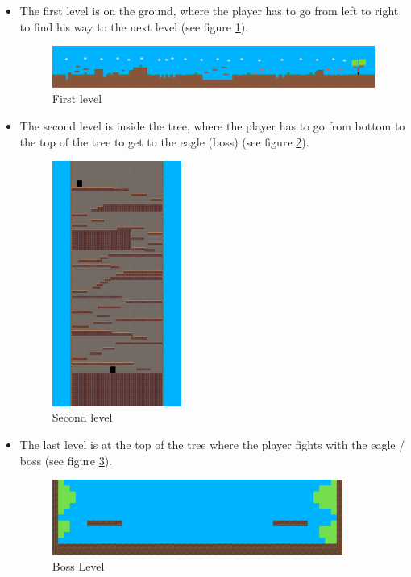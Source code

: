 \documentclass[12p]{article}
\begin{document}
\begin{itemize}
 \item The first level is on the ground, where the player has to go from left to right to find his way to the next level (see figure \ref{fig:FirstLevel}).
 
\begin{figure}[ht]
  \center
  \includegraphics[width=1\textwidth]{Documentation/level_1.png}
  \caption{First level}
  \label{fig:FirstLevel}
\end{figure}

 \item The second level is inside the tree, where the player has to go from bottom to the top of the tree to get to the eagle (boss) (see figure \ref{fig:SecondLevel}).

\begin{figure}[ht]
  \center
  \includegraphics[width=0.4\textwidth]{Documentation/level_2.png}
   \caption{Second level}
  \label{fig:SecondLevel}
\end{figure}

 \item The last level is at the top of the tree where the player fights with the eagle / boss (see figure \ref{fig:BossLevel}).
 
  \begin{figure}[ht]
      \center
      \includegraphics[width=0.9\textwidth]{Documentation/boss_level.png}
      \caption{Boss Level}
      \label{fig:BossLevel}
    \end{figure}
\end{itemize}
\end{document}
